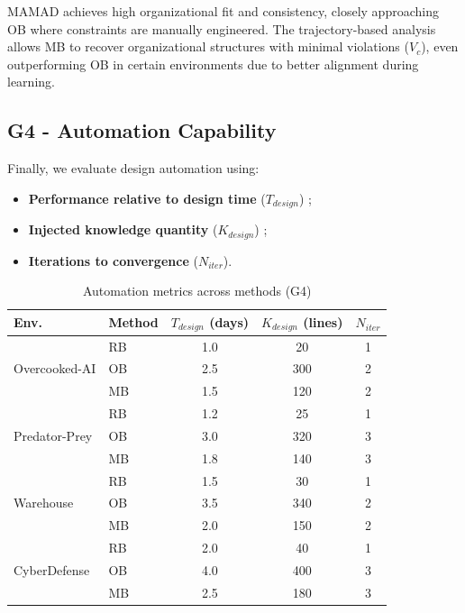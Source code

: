 \documentclass[pdflatex,sn-mathphys-num]{sn-jnl}%
\theoremstyle{thmstyleone}%
\theoremstyle{thmstyletwo}%
\theoremstyle{thmstylethree}%
\begin{document}
MAMAD achieves high organizational fit and consistency, closely approaching OB where constraints are manually engineered. The trajectory-based analysis allows MB to recover organizational structures with minimal violations ($V_c$), even outperforming OB in certain environments due to better alignment during learning.

\subsection{G4 - Automation Capability}

Finally, we evaluate design automation using:

\begin{itemize}
    \item \textbf{Performance relative to design time} ($T_{design}$) ;
    \item \textbf{Injected knowledge quantity} ($K_{design}$) ;
    \item \textbf{Iterations to convergence} ($N_{iter}$).
\end{itemize}

\begin{table}[h!]
    \centering
    \caption{Automation metrics across methods (G4)}
    \begin{tabular}{l|l|ccc}
        \hline
        \textbf{Env.} & \textbf{Method} & $T_{design}$ (days) & $K_{design}$ (lines) & $N_{iter}$ \\
        \hline
        \multirow{3}{*}{Overcooked-AI}
        & RB & 1.0 & 20 & 1 \\
        & OB & 2.5 & 300 & 2 \\
        & MB & 1.5 & 120 & 2 \\
        \hline
        \multirow{3}{*}{Predator-Prey}
        & RB & 1.2 & 25 & 1 \\
        & OB & 3.0 & 320 & 3 \\
        & MB & 1.8 & 140 & 3 \\
        \hline
        \multirow{3}{*}{Warehouse}
        & RB & 1.5 & 30 & 1 \\
        & OB & 3.5 & 340 & 2 \\
        & MB & 2.0 & 150 & 2 \\
        \hline
        \multirow{3}{*}{CyberDefense}
        & RB & 2.0 & 40 & 1 \\
        & OB & 4.0 & 400 & 3 \\
        & MB & 2.5 & 180 & 3 \\
        \hline
    \end{tabular}
    \label{tab:g4_full}
\end{table}
\end{document}
